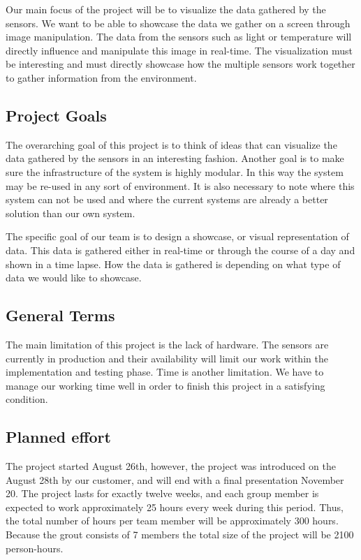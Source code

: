 \documentclass[../document.tex]{subfiles}
\begin{document}
Our main focus of the project will be to visualize the data gathered by the sensors. We want to be able to showcase the data we gather on a screen through image manipulation. The data from the sensors such as light or temperature will directly influence and manipulate this image in real-time. The visualization must be interesting and must directly showcase how the multiple sensors work together to gather information from the environment.

\subsection{Project Goals}
The overarching goal of this project is to think of ideas that can visualize the data gathered by the sensors in an interesting fashion. Another goal is to make sure the infrastructure of the system is highly modular. In this way the system may be re-used in any sort of environment. It is also necessary to note where this system can not be used and where the current systems are already a better solution than our own system.

The specific goal of our team is to design a showcase, or visual representation of data. This data is gathered either in real-time or through the course of a day and shown in a time lapse. How the data is gathered is depending on what type of data we would like to showcase. 

\subsection{General Terms}
The main limitation of this project is the lack of hardware. The sensors are currently in production and their availability will limit our work within the implementation and testing phase. Time is another limitation. We have to manage our working time well in order to finish this project in a satisfying condition.

\subsection{Planned effort}
The project started August 26th, however, the project was introduced on the August 28th by our customer, and will end with a final presentation November 20. The project lasts for exactly twelve weeks, and each group member is expected to work approximately 25 hours every week during this period. Thus, the total number of hours per team member will be approximately 300 hours. Because the grout consists of 7 members the total size of the project will be 2100 person-hours. 
\end{document}

